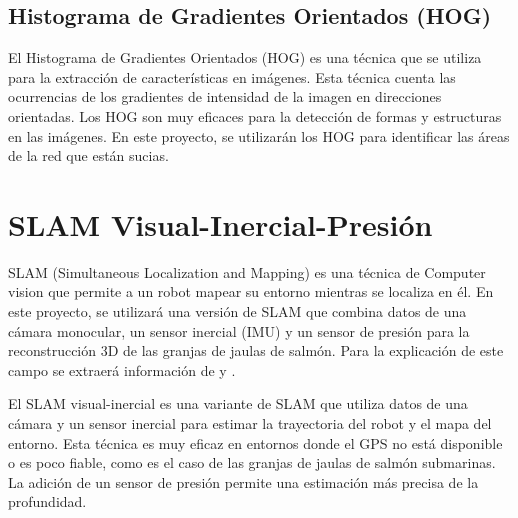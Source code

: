 \subsection{Histograma de Gradientes Orientados (HOG)}

El Histograma de Gradientes Orientados (HOG) es una técnica que se utiliza para la extracción de características en imágenes. Esta técnica cuenta las ocurrencias de los gradientes de intensidad de la imagen en direcciones orientadas. Los HOG son muy eficaces para la detección de formas y estructuras en las imágenes. En este proyecto, se utilizarán los HOG para identificar las áreas de la red que están sucias.


\section{SLAM Visual-Inercial-Presión}

SLAM (Simultaneous Localization and Mapping) es una técnica de Computer vision que permite a un robot mapear su entorno mientras se localiza en él. En este proyecto, se utilizará una versión de SLAM que combina datos de una cámara monocular, un sensor inercial (IMU) y un sensor de presión para la reconstrucción 3D de las granjas de jaulas de salmón. Para la explicación de este campo se extraerá información de \cite{cite:Gao} y \cite{cite:Ferrera}.

El SLAM visual-inercial es una variante de SLAM que utiliza datos de una cámara y un sensor inercial para estimar la trayectoria del robot y el mapa del entorno. Esta técnica es muy eficaz en entornos donde el GPS no está disponible o es poco fiable, como es el caso de las granjas de jaulas de salmón submarinas. La adición de un sensor de presión permite una estimación más precisa de la profundidad.